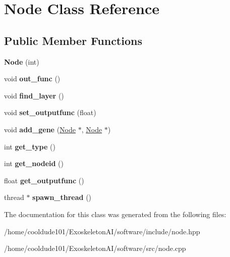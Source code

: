 \hypertarget{classNode}{}\section{Node Class Reference}
\label{classNode}
\subsection*{Public Member Functions}
\begin{DoxyCompactItemize}
\item 
{\bfseries Node} (int)\hypertarget{classNode_aff71d952af8363f046a67a8b12194e46}{}\label{classNode_aff71d952af8363f046a67a8b12194e46}

\item 
void {\bfseries out\+\_\+func} ()\hypertarget{classNode_a56cce09345b35818732eb14bbd155681}{}\label{classNode_a56cce09345b35818732eb14bbd155681}

\item 
void {\bfseries find\+\_\+layer} ()\hypertarget{classNode_adf8eb42b06ec971b693851d0877f74d5}{}\label{classNode_adf8eb42b06ec971b693851d0877f74d5}

\item 
void {\bfseries set\+\_\+outputfunc} (float)\hypertarget{classNode_aee405792704c95b3e6b4be9dcaa87ac0}{}\label{classNode_aee405792704c95b3e6b4be9dcaa87ac0}

\item 
void {\bfseries add\+\_\+gene} (\hyperlink{classNode}{Node} $\ast$, \hyperlink{classNode}{Node} $\ast$)\hypertarget{classNode_ab263a0702e33662e21cfbd0dffea8eb6}{}\label{classNode_ab263a0702e33662e21cfbd0dffea8eb6}

\item 
int {\bfseries get\+\_\+type} ()\hypertarget{classNode_a7d7b400dbc03f38514e6f7b24d6a9be6}{}\label{classNode_a7d7b400dbc03f38514e6f7b24d6a9be6}

\item 
int {\bfseries get\+\_\+nodeid} ()\hypertarget{classNode_ad0a9d74b00035704851696bfbbb1ad44}{}\label{classNode_ad0a9d74b00035704851696bfbbb1ad44}

\item 
float {\bfseries get\+\_\+outputfunc} ()\hypertarget{classNode_a9790c6b3cb6e82054cdda1663026fc21}{}\label{classNode_a9790c6b3cb6e82054cdda1663026fc21}

\item 
thread $\ast$ {\bfseries spawn\+\_\+thread} ()\hypertarget{classNode_ae5a550bbe528f423799541c965b963c4}{}\label{classNode_ae5a550bbe528f423799541c965b963c4}

\end{DoxyCompactItemize}


The documentation for this class was generated from the following files\+:\begin{DoxyCompactItemize}
\item 
/home/cooldude101/\+Exoskeleton\+A\+I/software/include/node.\+hpp\item 
/home/cooldude101/\+Exoskeleton\+A\+I/software/src/node.\+cpp\end{DoxyCompactItemize}
